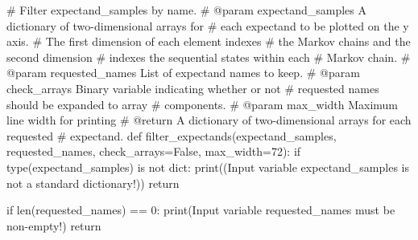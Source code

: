 \documentclass[
  letterpaper,
  DIV=11,
  numbers=noendperiod]{scrartcl}
\newenvironment{Shaded}{\begin{snugshade}}{\end{snugshade}}
\newcommand{\BuiltInTok}[1]{\textcolor[rgb]{0.00,0.23,0.31}{#1}}
\newcommand{\CommentTok}[1]{\textcolor[rgb]{0.37,0.37,0.37}{#1}}
\newcommand{\ControlFlowTok}[1]{\textcolor[rgb]{0.00,0.23,0.31}{#1}}
\newcommand{\DecValTok}[1]{\textcolor[rgb]{0.68,0.00,0.00}{#1}}
\newcommand{\KeywordTok}[1]{\textcolor[rgb]{0.00,0.23,0.31}{#1}}
\newcommand{\NormalTok}[1]{\textcolor[rgb]{0.00,0.23,0.31}{#1}}
\newcommand{\OperatorTok}[1]{\textcolor[rgb]{0.37,0.37,0.37}{#1}}
\newcommand{\StringTok}[1]{\textcolor[rgb]{0.13,0.47,0.30}{#1}}
\newcommand{\VariableTok}[1]{\textcolor[rgb]{0.07,0.07,0.07}{#1}}
\begin{document}
\begin{Shaded}
\begin{Highlighting}[]
\CommentTok{\# Filter \textasciigrave{}expectand\_samples\textasciigrave{} by name.}
\CommentTok{\# @param expectand\_samples A dictionary of two{-}dimensional arrays for}
\CommentTok{\#                          each expectand to be plotted on the y axis.}
\CommentTok{\#                          The first dimension of each element indexes }
\CommentTok{\#                          the Markov chains and the second dimension }
\CommentTok{\#                          indexes the sequential states within each }
\CommentTok{\#                          Markov chain.}
\CommentTok{\# @param requested\_names List of expectand names to keep.}
\CommentTok{\# @param check\_arrays Binary variable indicating whether or not }
\CommentTok{\#                     requested names should be expanded to array}
\CommentTok{\#                     components.}
\CommentTok{\# @param max\_width Maximum line width for printing}
\CommentTok{\# @return A dictionary of two{-}dimensional arrays for each requested}
\CommentTok{\#         expectand.}
\KeywordTok{def}\NormalTok{ filter\_expectands(expectand\_samples, requested\_names,}
\NormalTok{                      check\_arrays}\OperatorTok{=}\VariableTok{False}\NormalTok{, max\_width}\OperatorTok{=}\DecValTok{72}\NormalTok{):}
  \ControlFlowTok{if} \BuiltInTok{type}\NormalTok{(expectand\_samples) }\KeywordTok{is} \KeywordTok{not} \BuiltInTok{dict}\NormalTok{:}
    \BuiltInTok{print}\NormalTok{((}\StringTok{\textquotesingle{}Input variable \textasciigrave{}expectand\_samples\textasciigrave{} \textquotesingle{}}
           \StringTok{\textquotesingle{}is not a standard dictionary!\textquotesingle{}}\NormalTok{))}
    \ControlFlowTok{return}
  
  \ControlFlowTok{if} \BuiltInTok{len}\NormalTok{(requested\_names) }\OperatorTok{==} \DecValTok{0}\NormalTok{:}
    \BuiltInTok{print}\NormalTok{(}\StringTok{\textquotesingle{}Input variable \textasciigrave{}requested\_names\textasciigrave{} must be non{-}empty!\textquotesingle{}}\NormalTok{)}
    \ControlFlowTok{return}
  

\end{Highlighting}
\end{Shaded}
\end{document}
